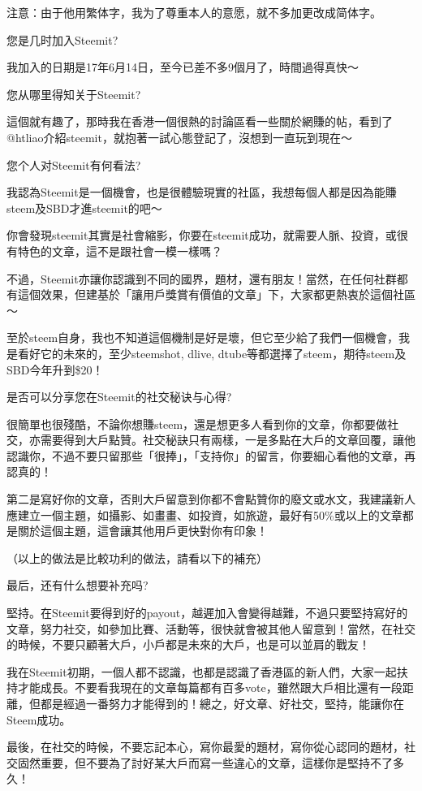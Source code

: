 \documentclass[]{ctexbook}
\begin{document}
注意：由于他用繁体字，我为了尊重本人的意愿，就不多加更改成简体字。

您是几时加入Steemit?

我加入的日期是17年6月14日，至今已差不多9個月了，時間過得真快～

您从哪里得知关于Steemit?

這個就有趣了，那時我在香港一個很熱的討論區看一些關於網賺的帖，看到了@htliao介紹steemit，就抱著一試心態登記了，沒想到一直玩到現在～

您个人对Steemit有何看法?

我認為Steemit是一個機會，也是很體驗現實的社區，我想每個人都是因為能賺steem及SBD才進steemit的吧～

你會發現steemit其實是社會縮影，你要在steemit成功，就需要人脈、投資，或很有特色的文章，這不是跟社會一模一樣嗎？

不過，Steemit亦讓你認識到不同的國界，題材，還有朋友！當然，在任何社群都有這個效果，但建基於「讓用戶獎賞有價值的文章」下，大家都更熱衷於這個社區～

至於steem自身，我也不知道這個機制是好是壞，但它至少給了我們一個機會，我是看好它的未來的，至少steemshot, dlive, dtube等都選擇了steem，期待steem及SBD今年升到\$20！

是否可以分享您在Steemit的社交秘诀与心得?

很簡單也很殘酷，不論你想賺steem，還是想更多人看到你的文章，你都要做社交，亦需要得到大戶點贊。社交秘訣只有兩樣，一是多點在大戶的文章回覆，讓他認識你，不過不要只留那些「很捧」，「支持你」的留言，你要細心看他的文章，再認真的！

第二是寫好你的文章，否則大戶留意到你都不會點贊你的廢文或水文，我建議新人應建立一個主題，如攝影、如畫畫、如投資，如旅遊，最好有50\%或以上的文章都是關於這個主題，這會讓其他用戶更快對你有印象！

（以上的做法是比較功利的做法，請看以下的補充）

最后，还有什么想要补充吗?

堅持。在Steemit要得到好的payout，越遲加入會變得越難，不過只要堅持寫好的文章，努力社交，如參加比賽、活動等，很快就會被其他人留意到！當然，在社交的時候，不要只顧著大戶，小戶都是未來的大戶，也是可以並肩的戰友！

我在Steemit初期，一個人都不認識，也都是認識了香港區的新人們，大家一起扶持才能成長。不要看我現在的文章每篇都有百多vote，雖然跟大戶相比還有一段距離，但都是經過一番努力才能得到的！總之，好文章、好社交，堅持，能讓你在Steem成功。

最後，在社交的時候，不要忘記本心，寫你最愛的題材，寫你從心認同的題材，社交固然重要，但不要為了討好某大戶而寫一些違心的文章，這樣你是堅持不了多久！
\end{document}
